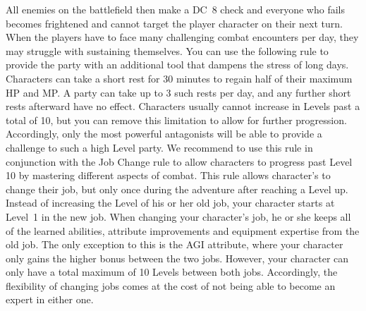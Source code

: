 All enemies on the battlefield then make a DC~8 check and everyone who fails becomes frightened and cannot target the player character on their next turn.
%
\clearpage
%
%
\vfill
%
When the players have to face many challenging combat encounters per day, they may struggle with sustaining themselves.
You can use the following rule to provide the party with an additional tool that dampens the stress of long days.
Characters can take a short rest for 30 minutes to regain half of their maximum HP and MP. 
A party can take up to 3 such rests per day, and any further short rests afterward have no effect.
%
\vfill
%
Characters usually cannot increase in Levels past a total of 10, but you can remove this limitation to allow for further progression.
Accordingly, only the most powerful antagonists will be able to provide a challenge to such a high Level party.
We recommend to use this rule in conjunction with the Job Change rule to allow characters to progress past Level 10 by mastering different aspects of combat.
%
\vfill
%
This rule allows character's to change their job, but only once during the adventure after reaching a Level up.
Instead of increasing the Level of his or her old job, your character starts at Level~1 in the new job.
When changing your character's job, he or she keeps all of the learned abilities, attribute improvements and equipment expertise from the old job.  
The only exception to this is the AGI attribute, where your character only gains the higher bonus between the two jobs.
However, your character can only have a total maximum of 10 Levels between both jobs.
Accordingly, the flexibility of changing jobs comes at the cost of not being able to become an expert in either one.
%
\vfill
%
